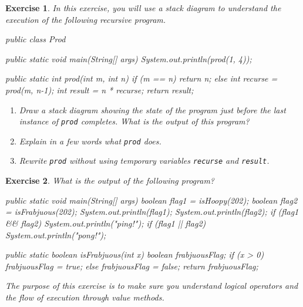 \documentclass[12pt]{book}
\theoremstyle{exercise}
\newtheorem{exercise}{Exercise}[chapter]
\newcommand{\java}[1]{\verb"#1"}
\newcommand{\java}[1]{\lstinline{#1}} %
\begin{document}
\begin{exercise}

In this exercise, you will use a stack diagram to understand the execution of the following recursive program.

\begin{code}
public class Prod {

    public static void main(String[] args) {
        System.out.println(prod(1, 4));
    }

    public static int prod(int m, int n) {
        if (m == n) {
            return n;
        } else {
            int recurse = prod(m, n-1);
            int result = n * recurse;
            return result;
        }
    }
}
\end{code}

\begin{enumerate}

\item Draw a stack diagram showing the state of the program just before the last instance of \java{prod} completes.
What is the output of this program?

\item Explain in a few words what \java{prod} does.

\item Rewrite \java{prod} without using temporary variables \java{recurse} and \java{result}.

\end{enumerate}

\end{exercise}


\begin{exercise}

What is the output of the following program?

\begin{code}
    public static void main(String[] args) {
        boolean flag1 = isHoopy(202);
        boolean flag2 = isFrabjuous(202);
        System.out.println(flag1);
        System.out.println(flag2);
        if (flag1 && flag2) {
            System.out.println("ping!");
        }
        if (flag1 || flag2) {
            System.out.println("pong!");
        }
    }
\end{code}


\begin{code}
    public static boolean isFrabjuous(int x) {
        boolean frabjuousFlag;
        if (x > 0) {
            frabjuousFlag = true;
        } else {
            frabjuousFlag = false;
        }
        return frabjuousFlag;
    }
\end{code}

The purpose of this exercise is to make sure you understand logical operators and the flow of execution through value methods.

\end{exercise}
\end{document}
